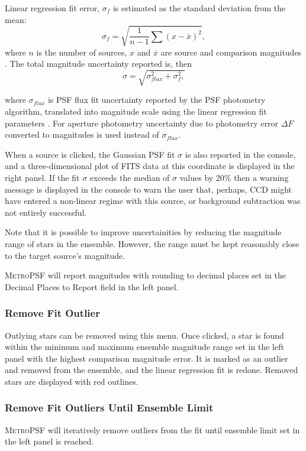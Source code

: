 \documentclass{article}
\begin{document}
Linear regression fit error, $\sigma_{f}$ is estimated as the standard deviation from the mean:
\begin{equation}
\sigma_{f}=\sqrt{\frac{1}{n-1}\sum (x-\overline{x})^2},
\end{equation}
where $n$ is the number of sources, $x$ and $\overline{x}$ are source and comparison magnitudes \citep{1992PASP..104..435H, 2005SASS...24..107K}. The total magnitude uncertainty reported is, then
\begin{equation}
\sigma = \sqrt{\sigma_{flux}^2 + \sigma_{f}^2,}
\end{equation}

where $\sigma_{flux}$ is PSF flux fit uncertainty reported by the PSF photometry algorithm, translated into magnitude scale using the linear regression fit parameters \citep{2010JAVSO..38..202P}. For aperture photometry uncertainty due to photometry error $\Delta F$ converted to magnitudes is used instead of $\sigma_{flux}$.

When a source is clicked, the Gaussian PSF fit $\sigma$ is also reported in the console, and a three-dimensional plot of FITS data at this coordinate is displayed in the right panel. If the fit $\sigma$ exceeds the median of $\sigma$ values by 20\% then a warning message is displayed in the console to warn the user that, perhaps, CCD might have entered a non-linear regime with this source, or background subtraction was not entirely successful. 

Note that it is possible to improve uncertainities by reducing the magnitude range of stars in the ensemble. However, the range must be kept reasonably close to the target source's magnitude. 

\textsc{MetroPSF} will report magnitudes with rounding to decimal places set in the Decimal Places to Report field in the left panel. 

\subsubsection{Remove Fit Outlier}
Outlying stars can be removed using this menu. Once clicked, a star is found within the minimum and maximum ensemble magnitude range set in the left panel with the highest comparison magnitude error. It is marked as an outlier and removed from the ensemble, and the linear regression fit is redone. Removed stars are displayed with red outlines. 

\subsubsection{Remove Fit Outliers Until Ensemble Limit}
\textsc{MetroPSF} will iteratively remove outliers from the fit until ensemble limit set in the left panel is reached. 
\end{document}
